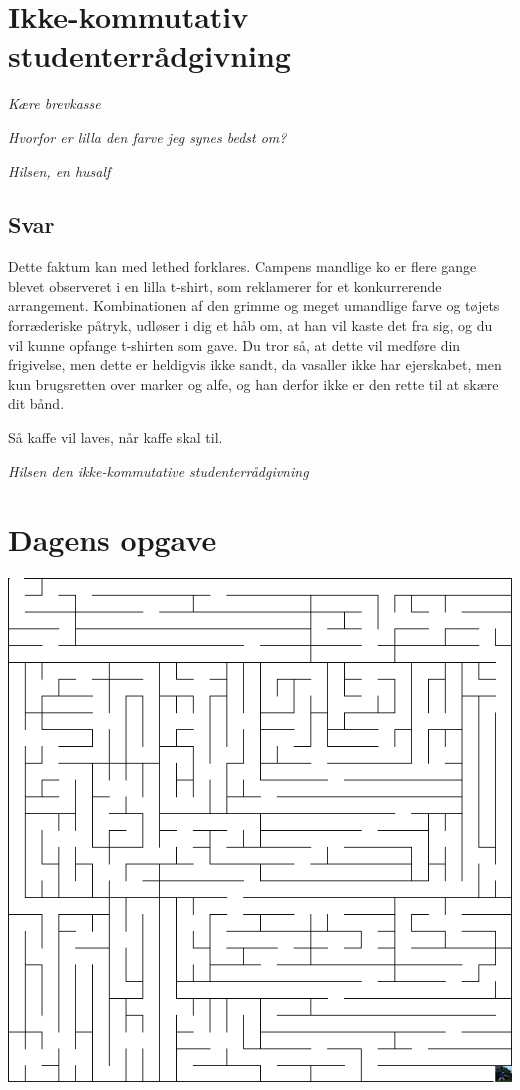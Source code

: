 \begin{minipage}[t]{170mm}
\vspace{3mm}
\section*{Ikke-kommutativ studenterrådgivning}
\emph{Kære brevkasse}

\emph{Hvorfor er  lilla den farve jeg synes bedst om?}

\emph{Hilsen, en husalf}

\subsection*{Svar}
Dette faktum kan med lethed forklares. Campens mandlige ko er flere gange blevet observeret i en lilla t-shirt, som reklamerer for et konkurrerende arrangement. Kombinationen af den grimme og meget umandlige farve og tøjets forræderiske påtryk, udløser i dig et håb om, at han vil kaste det fra sig, og du vil kunne opfange t-shirten som gave. Du tror så, at dette vil medføre din frigivelse, men dette er heldigvis ikke sandt, da vasaller ikke har ejerskabet, men kun brugsretten over marker og alfe, og han derfor ikke er den rette til at skære dit bånd.

Så kaffe vil laves, når kaffe skal til.

{\flushright\emph{Hilsen den ikke-kommutative studenterrådgivning}}
\vspace{3mm}
\section*{Dagens opgave}

\includegraphics[width=\textwidth]{mazemedfynbo.jpg}


\end{minipage}
